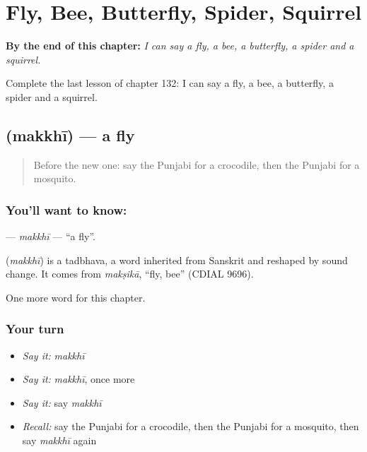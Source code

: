 
\chapter{Fly, Bee, Butterfly, Spider, Squirrel}
\label{ch:pa-fly-bee-butterfly-spider-squirrel}

\begin{chapteropening}
\textbf{By the end of this chapter:} \emph{I can say a fly, a bee, a butterfly, a spider and a squirrel.}

Complete the last lesson of chapter 132: I can say a fly, a bee, a butterfly, a spider and a squirrel.
\end{chapteropening}

\section[\texorpdfstring{\pa{ਮੱਖੀ} (makkhī)}{ਮੱਖੀ (makkhī)}]{ (makkhī) — a fly}

\label{lesson:PA-C132-makkhi}



\begin{quote}
Before the new one: say the Punjabi for a crocodile, then the Punjabi for a mosquito.
\end{quote}

\subsection*{You'll want to know: }
\textbf{} — \emph{makkhī} — \textquotedblleft{}a fly\textquotedblright{}.

\begin{cousinweb}
\textbf{} (\emph{makkhī}) is a tadbhava, a word inherited from Sanskrit and reshaped by sound change. It comes from \emph{makṣikā}, \textquotedblleft{}fly, bee\textquotedblright{} (CDIAL 9696).
\end{cousinweb}

\begin{grammarlens}[title={What you've built}]
One more word for this chapter.
\end{grammarlens}

\subsection*{Your turn}
\begin{itemize}
\raggedright
  \item \emph{Say it:} \emph{makkhī}
  \item \emph{Say it:} \emph{makkhī}, once more
  \item \emph{Say it:} say \emph{makkhī}
  \item \emph{Recall:} say the Punjabi for a crocodile, then the Punjabi for a mosquito, then say \emph{makkhī} again
\end{itemize}

